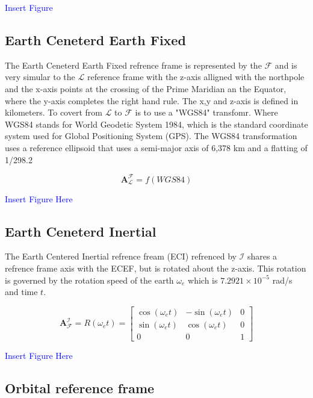 \textcolor{blue}{Insert Figure}

\subsection{Earth Ceneterd Earth Fixed}

The Earth Ceneterd Earth Fixed refrence frame is represented by the $\mathcal{F}$ and is very simular to the $\mathcal{L}$ reference frame with the z-axis alligned with the northpole
and the x-axis points at the crossing of the Prime Maridian an the Equator, where the y-axis completes the right hand rule. The x,y and z-axis is defined in kilometers.
To covert from $\mathcal{L}$ to $\mathcal{F}$ is to use a "WGS84" transfomr. Where WGS84 stands for World Geodetic System 1984, which is the standard coordinate system used for
Global Positioning System (GPS). The WGS84 transformation uses a reference ellipsoid that uses a semi-major axis of 6,378 km and a flatting of 1/298.2

\begin{equation}
        \mathbf{A}_{\mathcal{L}}^{\mathcal{F}} = f(WGS84)
\end{equation}

\textcolor{blue}{Insert Figure Here}

\subsection{Earth Ceneterd Inertial}

The Earth Centered Inertial refrence fream (ECI) refrenced by $\mathcal{I}$ shares a refrence frame axis with the ECEF, but is rotated about the z-axis. This rotation is governed
by the rotation speed of the earth $\omega_e$ which is $7.2921\times10^{-5}$ rad/s and time $t$.

\begin{equation}
    \mathbf{A}_{\mathcal{F}}^{\mathcal{I}} = R(\omega_e t) = 
    \begin{bmatrix}
        \cos(\omega_e t) & -\sin(\omega_e t) & 0\\
        \sin(\omega_e t) & \cos(\omega_e t) & 0\\
        0 & 0 & 1
    \end{bmatrix}
\end{equation}

\textcolor{blue}{Insert Figure Here}

\subsection{Orbital reference frame}

